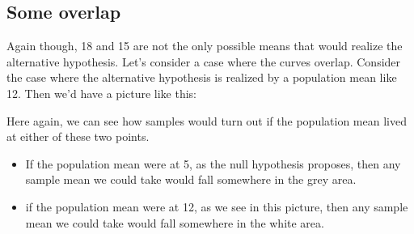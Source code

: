 \documentclass[../../../main.tex]{subfiles}
\begin{document}
\subsection{Some overlap}

Again though, 18 and 15 are not the only possible means that would realize the alternative hypothesis. Let's consider a case where the curves overlap. Consider the case where the alternative hypothesis is realized by a population mean like 12. Then we'd have a picture like this:

\begin{center}
\end{center}

\noindent
Here again, we can see how samples would turn out if the population mean lived at either of these two points. 

\begin{itemize}

  \item If the population mean were at 5, as the null hypothesis proposes, then any sample mean we could take would fall somewhere in the grey area.
  
  \item if the population mean were at 12, as we see in this picture, then any sample mean we could take would fall somewhere in the white area.

\end{itemize}
\end{document}
